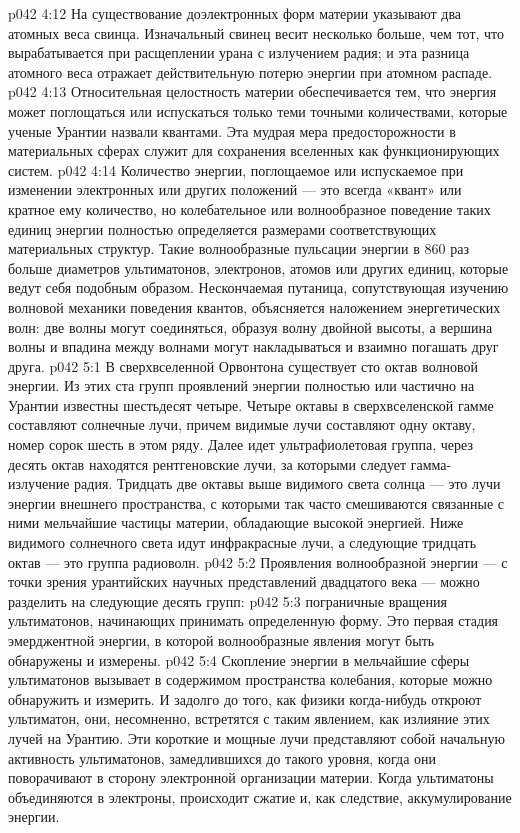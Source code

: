 \vs p042 4:12 \pc На существование доэлектронных форм материи указывают два атомных веса свинца. Изначальный свинец весит несколько больше, чем тот, что вырабатывается при расщеплении урана с излучением радия; и эта разница атомного веса отражает действительную потерю энергии при атомном распаде.
\vs p042 4:13 \pc Относительная целостность материи обеспечивается тем, что энергия может поглощаться или испускаться только теми точными количествами, которые ученые Урантии назвали квантами. Эта мудрая мера предосторожности в материальных сферах служит для сохранения вселенных как функционирующих систем.
\vs p042 4:14 Количество энергии, поглощаемое или испускаемое при изменении электронных или других положений --- это всегда «квант» или кратное ему количество, но колебательное или волнообразное поведение таких единиц энергии полностью определяется размерами соответствующих материальных структур. Такие волнообразные пульсации энергии в 860 раз больше диаметров ультиматонов, электронов, атомов или других единиц, которые ведут себя подобным образом. Нескончаемая путаница, сопутствующая изучению волновой механики поведения квантов, объясняется наложением энергетических волн: две волны могут соединяться, образуя волну двойной высоты, а вершина волны и впадина между волнами могут накладываться и взаимно погашать друг друга.
\vs p042 5:1 В сверхвселенной Орвонтона существует сто октав волновой энергии. Из этих ста групп проявлений энергии полностью или частично на Урантии известны шестьдесят четыре. Четыре октавы в сверхвселенской гамме составляют солнечные лучи, причем видимые лучи составляют одну октаву, номер сорок шесть в этом ряду. Далее идет ультрафиолетовая группа, через десять октав находятся рентгеновские лучи, за которыми следует гамма\hyp{}излучение радия. Тридцать две октавы выше видимого света солнца --- это лучи энергии внешнего пространства, с которыми так часто смешиваются связанные с ними мельчайшие частицы материи, обладающие высокой энергией. Ниже видимого солнечного света идут инфракрасные лучи, а следующие тридцать октав --- это группа радиоволн.
\vs p042 5:2 \pc Проявления волнообразной энергии --- с точки зрения урантийских научных представлений двадцатого века --- можно разделить на следующие десять групп:
\vs p042 5:3 \bibnobreakspace {} пограничные вращения ультиматонов, начинающих принимать определенную форму. Это первая стадия эмерджентной энергии, в которой волнообразные явления могут быть обнаружены и измерены.
\vs p042 5:4 \bibnobreakspace {} Скопление энергии в мельчайшие сферы ультиматонов вызывает в содержимом пространства колебания, которые можно обнаружить и измерить. И задолго до того, как физики когда\hyp{}нибудь откроют ультиматон, они, несомненно, встретятся с таким явлением, как излияние этих лучей на Урантию. Эти короткие и мощные лучи представляют собой начальную активность ультиматонов, замедлившихся до такого уровня, когда они поворачивают в сторону электронной организации материи. Когда ультиматоны объединяются в электроны, происходит сжатие и, как следствие, аккумулирование энергии.
